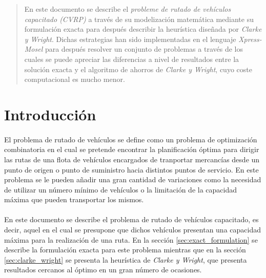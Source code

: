 \documentclass[spanish]{article}
\begin{document}
	\maketitle %

	\thispagestyle{fancy} %



	\begin{abstract}
		\noindent En este documento se describe el \emph{probleme de rutado de vehículos capacitado (CVRP)} a través de su modelización matemática mediante su formulación exacta para después describir la heurística diseñada por \emph{Clarke y Wright}. Dichas estrategias han sido implementadas en el lenguaje \emph{Xpress-Mosel} \cite{tool:xpress-mosel} para después resolver un conjunto de problemas a través de los cuales se puede apreciar las diferencias a nivel de resultados entre la solución exacta y el algoritmo de ahorros de \emph{Clarke y Wright}, cuyo coste computacional es mucho menor.
	\end{abstract}


	\section{Introducción}
	\label{sec:intro}

		\paragraph{}
		El problema de rutado de vehículos se define como un problema de optimización combinatoria en el cual se pretende encontrar la planificación óptima para dirigir las rutas de una flota de vehículos encargados de tranportar mercancías desde un punto de origen o punto de suministro hacia distintos puntos de servicio. En este problema se le pueden añadir una gran cantidad de variaciones como la necesidad de utilizar un número mínimo de vehículos o la limitación de la capacidad máxima que pueden transportar los mismos.

		\paragraph{}
		En este documento se describe el problema de rutado de vehículos capacitado, es decir, aquel en el cual se presupone que dichos vehículos presentan una capacidad máxima para la realización de una ruta. En la sección \ref{sec:exact_formulation} se describe la formulación exacta para este problema mientras que en la sección \ref{sec:clarke_wright} se presenta la heurística de \emph{Clarke y Wright}, que presenta resultados cercanos al óptimo en un gran número de ocasiones.
\end{document}
